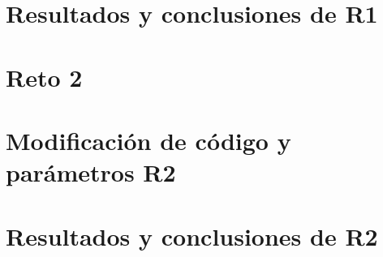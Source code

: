 \documentclass[a4paper]{article}
\begin{document}
\section{Resultados y conclusiones de R1}

\section{Reto 2}


\section{Modificación de código y parámetros R2}

\section{Resultados y conclusiones de R2}
\end{document}
